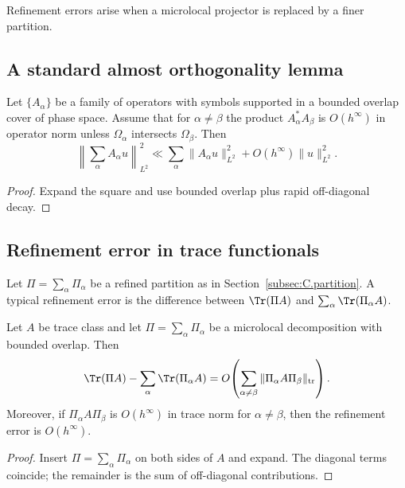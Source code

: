 Refinement errors arise when a microlocal projector is replaced by a finer partition.

\subsection{A standard almost orthogonality lemma}
\label{subsec:C.almost-orth}

\begin{lemma}
\label{lem:C.almost-orth}
Let $\{A_\alpha\}$ be a family of operators with symbols supported in a bounded overlap cover of phase space.
Assume that for $\alpha\neq\beta$ the product $A_\alpha^\ast A_\beta$ is $O(h^\infty)$ in operator norm unless
$\Omega_\alpha$ intersects $\Omega_\beta$.
Then
\[
\left\|\sum_\alpha A_\alpha u\right\|_{L^2}^2
\ll
\sum_\alpha \|A_\alpha u\|_{L^2}^2
+
O(h^\infty)\|u\|_{L^2}^2.
\]
\end{lemma}

\begin{proof}
Expand the square and use bounded overlap plus rapid off-diagonal decay.
\end{proof}

\subsection{Refinement error in trace functionals}
\label{subsec:C.refinement-trace}

Let $\Pi=\sum_\alpha \Pi_\alpha$ be a refined partition as in Section~\ref{subsec:C.partition}.
A typical refinement error is the difference between $\Tr(\Pi A)$ and $\sum_\alpha \Tr(\Pi_\alpha A)$.

\begin{proposition}
\label{prop:C.trace-refinement}
Let $A$ be trace class and let $\Pi=\sum_\alpha \Pi_\alpha$ be a microlocal decomposition with bounded overlap.
Then
\[
\Tr(\Pi A) - \sum_\alpha \Tr(\Pi_\alpha A)
=
O\!\left(\sum_{\alpha\neq\beta}\|\Pi_\alpha A \Pi_\beta\|_{\mathrm{tr}}\right).
\]
Moreover, if $\Pi_\alpha A \Pi_\beta$ is $O(h^\infty)$ in trace norm for $\alpha\neq\beta$, then the refinement error
is $O(h^\infty)$.
\end{proposition}

\begin{proof}
Insert $\Pi=\sum_\alpha \Pi_\alpha$ on both sides of $A$ and expand.  The diagonal terms coincide; the remainder is the
sum of off-diagonal contributions.
\end{proof}

